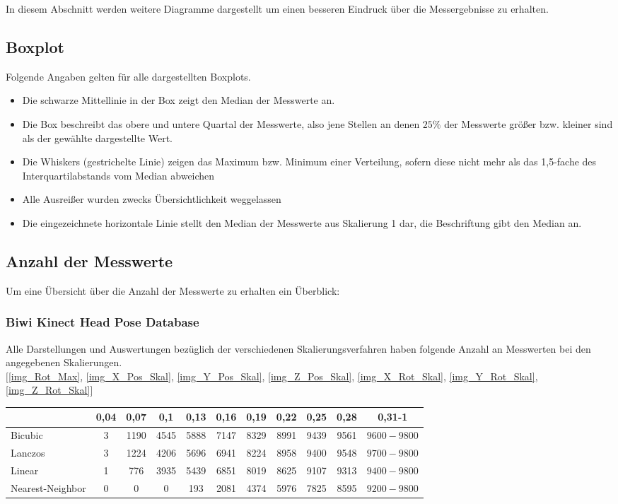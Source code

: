 \label{Abbildungen}
In diesem Abschnitt werden weitere Diagramme dargestellt um einen besseren Eindruck über die Messergebnisse zu erhalten.
\subsection*{Boxplot}
Folgende Angaben gelten für alle dargestellten Boxplots.
\begin{itemize}
	\item Die schwarze Mittellinie in der Box zeigt den Median der Messwerte an.
	\item Die Box beschreibt das obere und untere Quartal der Messwerte, also jene Stellen an denen $25\%$ der Messwerte größer bzw. kleiner sind als der gewählte dargestellte Wert.
	\item \glqq Die Whiskers (gestrichelte Linie) zeigen das Maximum bzw. Minimum einer Verteilung, sofern diese nicht mehr als das 1,5-fache des Interquartilabstands vom Median abweichen\grqq 
	\cite{wiki_Boxplot}
	\item Alle Ausreißer wurden zwecks Übersichtlichkeit weggelassen
	\item Die eingezeichnete horizontale Linie stellt den Median der Messwerte aus Skalierung 1 dar, die Beschriftung gibt den Median an.
\end{itemize}
\subsection*{Anzahl der Messwerte}
Um eine Übersicht über die Anzahl der Messwerte zu erhalten ein Überblick:
\subsubsection*{Biwi Kinect Head Pose Database}
Alle Darstellungen und Auswertungen bezüglich der verschiedenen Skalierungsverfahren haben folgende Anzahl an Messwerten bei den angegebenen Skalierungen.\\
$[$\autoref{img_Rot_Max}, \autoref{img_X_Pos_Skal}, \autoref{img_Y_Pos_Skal}, \autoref{img_Z_Pos_Skal}, \autoref{img_X_Rot_Skal}, \autoref{img_Y_Rot_Skal}, \autoref{img_Z_Rot_Skal}$]$\\
\begin{tabular}{|l|c|c|c|c|c|c|c|c|c|c|}
	\hline 
	&0,04&0,07&0,1&0,13&0,16&0,19&0,22&0,25&0,28&0,31-1\\
	\hline 
	Bicubic&3&1190&4545&5888&7147&8329&8991&9439&9561&$9600-9800$\\
	\hline 
	Lanczos&3&1224&4206&5696&6941&8224&8958&9400&9548&$9700-9800$\\
	\hline 
	Linear&1&776&3935&5439&6851&8019&8625&9107&9313&$9400-9800$\\
	\hline 
	Nearest-Neighbor&0&0&0&193&2081&4374&5976&7825&8595&$9200-9800$\\ 
	\hline 
\end{tabular} 
